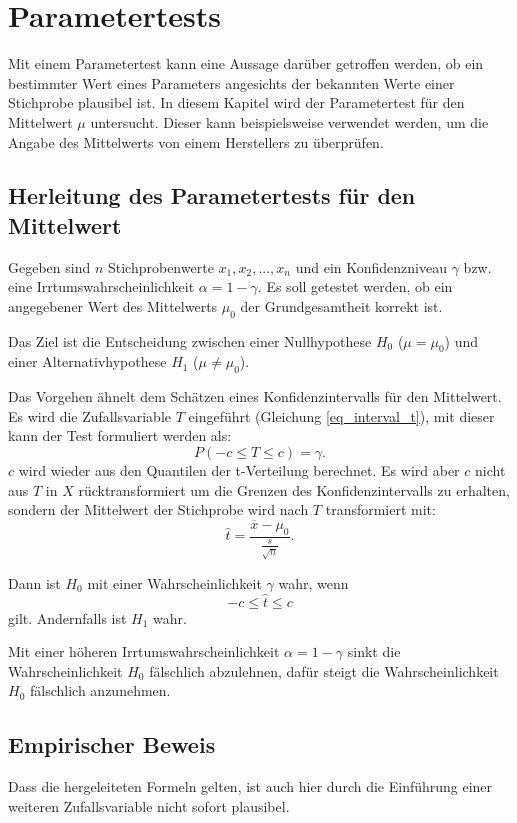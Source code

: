 \documentclass[10pt,twocolumn]{scrartcl}
\begin{document}
\section{Parametertests}
		Mit einem Parametertest kann eine Aussage darüber getroffen werden, ob ein bestimmter Wert eines Parameters angesichts der bekannten Werte einer Stichprobe plausibel ist. In diesem Kapitel wird der Parametertest für den Mittelwert $\mu$ untersucht. Dieser kann beispielsweise verwendet werden, um die Angabe des Mittelwerts von einem Herstellers zu überprüfen.
		
	\subsection{Herleitung des Parametertests für den Mittelwert}
		Gegeben sind $n$ Stichprobenwerte $x_1, x_2, ..., x_n$ und ein Konfidenzniveau $\gamma$ bzw. eine Irrtumswahrscheinlichkeit $\alpha = 1 - \gamma$. Es soll getestet werden, ob ein angegebener Wert des Mittelwerts $\mu_0$ der Grundgesamtheit korrekt ist.

		Das Ziel ist die Entscheidung zwischen einer Nullhypothese $H_0$ ($\mu = \mu_0$) und einer Alternativhypothese $H_1$ ($\mu \ne \mu_0$).

		Das Vorgehen ähnelt dem Schätzen eines Konfidenzintervalls für den Mittelwert. Es wird die Zufallsvariable $T$ eingeführt (Gleichung \ref{eq_interval_t}), mit dieser kann der Test formuliert werden als:
		\begin{equation}
		P(-c \le T \le c) = \gamma .
		\end{equation}
		$c$ wird wieder aus den Quantilen der t-Verteilung berechnet. Es wird aber $c$ nicht aus $T$ in $X$ rücktransformiert um die Grenzen des Konfidenzintervalls zu erhalten, sondern der Mittelwert der Stichprobe wird nach $T$ transformiert mit:
		\begin{equation}
		\hat{t} = \frac{\overline{x} - \mu_0}{\frac{s}{\sqrt{n}}} .
		\end{equation}

		Dann ist $H_0$ mit einer Wahrscheinlichkeit $\gamma$ wahr, wenn
		\begin{equation}
		-c \le \hat{t} \le c
		\end{equation}
		gilt. Andernfalls ist $H_1$ wahr.

		Mit einer höheren Irrtumswahrscheinlichkeit $\alpha = 1 - \gamma$ sinkt die Wahrscheinlichkeit $H_0$ fälschlich abzulehnen, dafür steigt die Wahrscheinlichkeit $H_0$ fälschlich anzunehmen.
	\subsection{Empirischer Beweis}
		Dass die hergeleiteten Formeln gelten, ist auch hier durch die Einführung einer weiteren Zufallsvariable nicht sofort plausibel.
\end{document}
